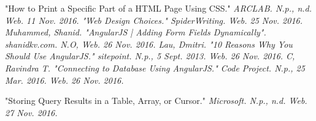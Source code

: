 \documentclass[letterpaper,10pt,serif, draftclsnofoot,onecolumn, compsoc, titlepage]{IEEEtran}
\begin{document}
\begin{thebibliography}{2}
"How to Print a Specific Part of a HTML Page Using CSS." \em{ARCLAB}. N.p., n.d. Web. 11 Nov. 2016. 
 "Web Design Choices." \em{SpiderWriting}. Web. 25 Nov. 2016. 
  Muhammed, Shanid. "AngularJS | Adding Form Fields Dynamically". \em{shanidkv.com}. N.O, Web. 26 Nov. 2016. 
 Lau, Dmitri. "10 Reasons Why You Should Use AngularJS." \em{sitepoint}. N.p., 5 Sept. 2013. Web. 26 Nov. 2016.
 C, Ravindra T. "Connecting to Database Using AngularJS." \em{Code Project}. N.p., 25 Mar. 2016. Web. 26 Nov. 2016.

 "Storing Query Results in a Table, Array, or Cursor." \em{Microsoft}. N.p., n.d. Web. 27 Nov. 2016.

\end{thebibliography}
\end{document}
